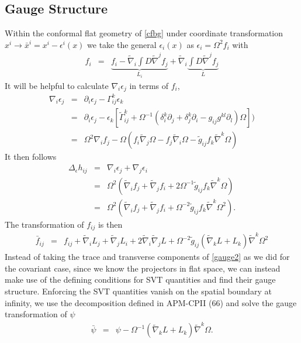 \documentclass[10pt,letterpaper]{article}
\numberwithin{equation}{section}
\begin{document}
\subsection{Gauge Structure}
Within the conformal flat geometry of \eqref{cfbg} under coordinate transformation $x^i \to \bar x^i = x^i - \epsilon^i (x)$ we take the general $\epsilon_i(x)$ as $\epsilon_i = \Omega^2 f_i$ with
\begin{eqnarray}
f_i &=&  \underbrace{f_i - \tilde\nabla_i \int D \tilde\nabla^j f_j}_{L_i} + \tilde\nabla_i \underbrace{\int D\tilde \nabla^j f_j}_{L}
\end{eqnarray}
It will be helpful to calculate $\nabla_i \epsilon_j$ in terms of $f_i$,
\begin{eqnarray}
\nabla_i \epsilon_j &=& \partial_i \epsilon_j - \Gamma^k_{ij} \epsilon_k
\nonumber\\
&=& \partial_i \epsilon_j - \epsilon_k \left[ \tilde \Gamma^{k}_{ij} + \Omega^{-1}( \delta^k_i \partial_j +\delta^k_j \partial_i -  g_{ij}  g^{kl}\partial_l)\Omega\right])
\nonumber\\
&=& \Omega^2 \nabla_i f_j -\Omega( f_i\tilde\nabla_j\Omega - f_j\tilde\nabla_i \Omega - \tilde g_{ij} f_k\tilde\nabla^k\Omega)
\end{eqnarray}
It then follows 
\begin{eqnarray}
\Delta_\epsilon h_{ij} &=& \nabla_i \epsilon_j + \nabla_j\epsilon_i
\nonumber\\
&=& \Omega^2 (\tilde\nabla_i f_j + \tilde\nabla_j f_i + 2\Omega^{-1}\tilde g_{ij}f_k \tilde\nabla^k\Omega )
\nonumber\\
&=&\Omega^2 (\tilde\nabla_i f_j + \tilde\nabla_j f_i +\Omega^{-2}\tilde g_{ij}f_k \tilde\nabla^k\Omega^{2} ).
\end{eqnarray}
The transformation of $f_{ij}$ is then
\begin{eqnarray}
\bar f_{ij} &=& f_{ij} + \tilde\nabla_i L_j + \tilde\nabla_j L_i + 2\tilde \nabla_i\tilde\nabla_j L + \Omega^{-2}
\tilde g_{ij}(\tilde\nabla_k L + L_k)\tilde\nabla^k \Omega^2
\label{gauge2}
\end{eqnarray}
Instead of taking the trace and transverse components of \eqref{gauge2} as we did for the covariant case, since we know the projectors in flat space, we can instead make use of the defining conditions for SVT quantities and find their gauge structure. Enforcing the SVT quantities vanish on the spatial boundary at infinity, we use the decomposition defined in APM-CPII (66)
and solve the gauge transformation of $\psi$
\begin{eqnarray}
\bar\psi &=& \psi - \Omega^{-1}(\tilde\nabla_k L + L_k)\tilde\nabla^k \Omega.
\end{eqnarray}
\end{document}
